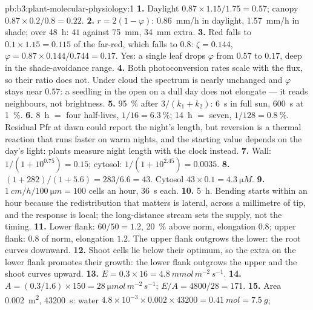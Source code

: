 \begin{solution}{pb:b3:plant-molecular-physiology:1}
\textbf{1.} Daylight $0.87\times 1.15/1.75 = 0.57$; canopy $0.87\times
0.2/0.8 = 0.22$.
\textbf{2.} $r = 2(1 - \varphi)$: \qty{0.86}{mm/h} in daylight,
\qty{1.57}{mm/h} in shade; over \qty{48}{h}: $41$ against \qty{75}{mm},
\qty{34}{mm} extra.
\textbf{3.} Red falls to $0.1\times 1.15 = 0.115$ of the far-red, which
falls to $0.8$: $\zeta = 0.144$, $\varphi = 0.87\times 0.144/0.744 =
0.17$. Yes: a single leaf drops $\varphi$ from $0.57$ to $0.17$, deep in
the shade-avoidance range.
\textbf{4.} Both photoconversion rates scale with the flux, so their
ratio does not. Under cloud the spectrum is nearly unchanged and
$\varphi$ stays near $0.57$: a seedling in the open on a dull day does
not elongate --- it reads neighbours, not brightness.
\textbf{5.} \qty{95}{\%} after $3/(k_{1} + k_{2})$: \qty{6}{s} in full
sun, \qty{600}{s} at \qty{1}{\%}.
\textbf{6.} \qty{8}{h} $=$ four half-lives, $1/16 = \qty{6.3}{\%}$;
\qty{14}{h} $=$ seven, $1/128 = \qty{0.8}{\%}$. Residual Pfr at dawn
could report the night's length, but reversion is a thermal reaction
that runs faster on warm nights, and the starting value depends on the
day's light: plants measure night length with the clock instead.
\textbf{7.} Wall: $1/(1 + 10^{0.75}) = 0.15$; cytosol: $1/(1 +
10^{2.45}) = 0.0035$.
\textbf{8.} $(1 + 282)/(1 + 5.6) = 283/6.6 = 43$. Cytosol
$43\times 0.1 = \qty{4.3}{\micro M}$.
\textbf{9.} $\qty{1}{cm/h}/\qty{100}{\micro m} = 100$ cells an hour,
\qty{36}{s} each.
\textbf{10.} \qty{5}{h}. Bending starts within an hour because the
redistribution that matters is lateral, across a millimetre of tip,
and the response is local; the long-distance stream sets the supply,
not the timing.
\textbf{11.} Lower flank: $60/50 = 1.2$,  \qty{20}{\%} above norm,
elongation $0.8$; upper flank: $0.8$ of norm, elongation $1.2$. The upper
flank outgrows the lower: the root curves downward.
\textbf{12.} Shoot cells lie below their  optimum, so the extra
 on the lower flank promotes their growth: the lower flank outgrows
the upper and the shoot curves upward.
\textbf{13.} $E = 0.3\times 16 = \qty{4.8}{mmol\,m^{-2}\,s^{-1}}$.
\textbf{14.} $A = (0.3/1.6)\times 150 = \qty{28}{\micro mol\,m^{-2}\,s^{-1}}$;
$E/A = 4800/28 = 171$.
\textbf{15.} Area \qty{0.002}{m^2}, \num{43200}~s: water $4.8\times
10^{-3}\times 0.002\times\num{43200} = \qty{0.41}{mol} = \qty{7.5}{g}$;

\end{solution}

